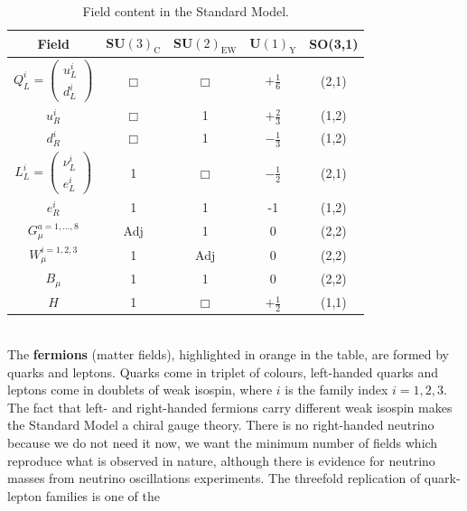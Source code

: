 \documentclass[../main.tex]{subfiles}
\begin{document}
\begin{table}[h]
        \centering
        \begin{tabular}{c|c|c|c|c}
        \hline
        \rowcolor{gray!45}Field & SU$(3)_{\text{C}}$ & SU$(2)_{\text{EW}}$ & U$(1)_{\text{Y}}$ & SO(3,1) \\
        \hline
        \cellcolor{orange!45}$Q_L^i=\begin{pmatrix}
             u_L^i\\
             d_L^i 
        \end{pmatrix}$ & \cellcolor{orange!45}$\Box$ & \cellcolor{orange!45}$\Box$ & \cellcolor{orange!45}$+\frac{1}{6}$ &\cellcolor{orange!45} (2,1) \\
        \rowcolor{orange!45}$u_R^i$ & $\Box$ & 1 & $+\frac{2}{3}$ & (1,2) \\
        \rowcolor{orange!45}$d_R^i$ & $\Box$ & 1 & $-\frac{1}{3}$ & (1,2) \\
        \hline
        \cellcolor{orange!45}$L_L^i=\begin{pmatrix}\nu_L^i\\e_L^i\end{pmatrix}$ &\cellcolor{orange!45} 1 &\cellcolor{orange!45} $\Box$ &\cellcolor{orange!45} $-\frac{1}{2}$ &\cellcolor{orange!45} (2,1) \\
        \rowcolor{orange!45}$e_R^i$ & 1 & 1 & -1 & (1,2) \\
        \hline
        \rowcolor{blue!35}$G_\mu^{a=1,\dots,8}$ & Adj & 1 & 0 & (2,2)\\
        \rowcolor{blue!35}$W_\mu^{i=1,2,3}$ & 1 & Adj & 0 & (2,2)\\
        \rowcolor{blue!35}$B_\mu$ & 1 & 1 & 0 & (2,2)\\
        \hline
        \rowcolor{purple!45}$H$ & 1 & $\Box$ & $+\frac{1}{2}$ & (1,1)\\
        \hline
        \end{tabular}
        \caption{Field content in the Standard Model.}
    \end{table}\\
The \textbf{fermions} (matter fields), highlighted in orange in the table, are formed by quarks and leptons. Quarks come in triplet of colours, left-handed quarks and leptons come in doublets of weak isospin, where $i$ is the family index $i=1,2,3$. The fact that left- and right-handed fermions carry different weak isospin makes the Standard Model a chiral gauge theory. There is no right-handed neutrino because we do not need it now, we want the minimum number of fields which reproduce what is observed in nature, although there is evidence for neutrino masses from neutrino oscillations experiments. The threefold replication of quark-lepton families is one of the
\end{document}
